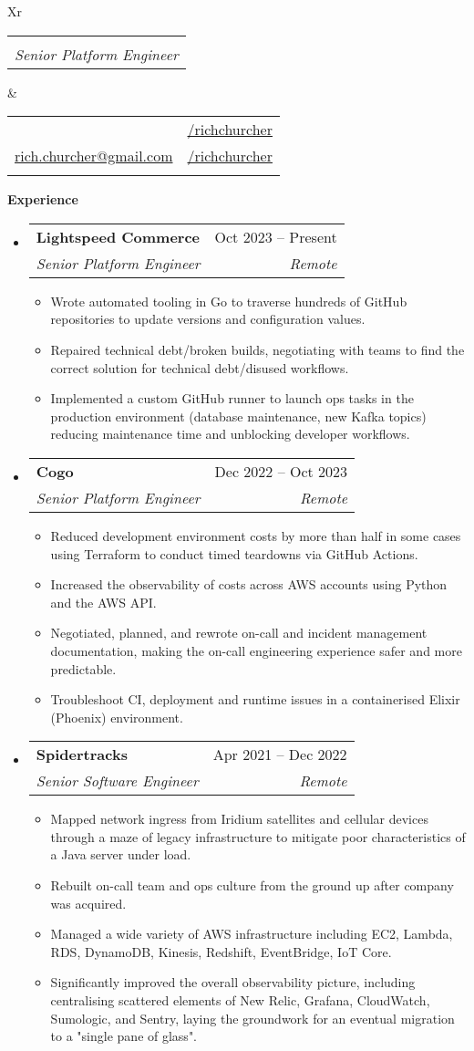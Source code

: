 \documentclass[12pt]{article}
\makeatletter
\def \fullname {Rich Churcher}
\def \subtitle {Senior Platform Engineer}
\def \linkedinicon {\faLinkedin}
\def \linkedinlink {https://linkedin.com/in/dwight-schrute/}
\def \linkedintext {/richchurcher}
\def \phoneicon {\faPhone}
\def \phonetext {+64-21-126-3919}
\def \emailicon {\faEnvelope}
\def \emaillink {mailto:rich.churcher@gmail.com}
\def \emailtext {rich.churcher@gmail.com}
\def \githubicon {\faGithub}
\def \githublink {https://github.com/richchurcher}
\def \githubtext {/richchurcher}
\def \headertype {\doublecol} %
\def \entryspacing {-0em}
\def \linkedin {\linkedinicon \hspace{1em}\href{\linkedinlink}{\linkedintext}}
\def \phone {\phoneicon \hspace{1em}{\phonetext}}
\def \email {\emailicon \hspace{1em}\href{\emaillink}{\emailtext}}
\def \github {\githubicon \hspace{1em}\href{\githublink}{\githubtext}}
\renewcommand{\section}[2]{\vspace{0.5ex}
  \colorbox{secondary}{\color{white}\raggedbottom\normalsize\textbf{{#1}{\hspace{0.5em}#2}}}
}
\newcommand{\resumeEntryStart}{\begin{itemize}[leftmargin=2.5mm]}
\newcommand{\resumeEntryEnd}{\end{itemize}\vspace{\entryspacing}}
\newcommand{\resumeItemListStart}{\begin{itemize}[leftmargin=4.5mm]}
\newcommand{\resumeItemListEnd}{\end{itemize}}
\newcommand{\resumeItem}[1]{
  \item\small{
    {#1 \vspace{-0.9ex}}
  }
}
\newcommand{\resumeEntryTSDL}[4]{
  \vspace{-0.5ex}\item[]
    \begin{tabularx}{0.97\textwidth}{X@{\hspace{5em}}r}
      \textbf{\color{primary}#1} & {\firabook\color{accent}\small#2} \\
      \textit{\color{accent}\small#3} & \textit{\color{accent}\small#4} \\
    \end{tabularx}\vspace{-0.9ex}
}
\newcommand{\doublecol}[6]{
  \begin{tabularx}{\textwidth}{Xr}
    {
      \begin{tabular}[c]{l}
        \fontsize{35}{45}\selectfont{\color{primary}{{\textbf{\fullname}}}} \\
          {\textit{\subtitle}}
      \end{tabular}\vspace{2ex}
    } & {
      \begin{tabular}[c]{l@{\hspace{1em}}l}
        {\small#4} & {\small#1} \\
        {\small#5} & {\small#2} \\
        {\small#6} & {\small#3}
      \end{tabular}
    }
  \end{tabularx}
}
\newcommand{\singlecol}[6]{
  \begin{tabularx}{\textwidth}{Xr}
    {
      \begin{tabular}[b]{l}
        \fontsize{35}{45}\selectfont{\color{primary}{{\textbf{\fullname}}}} \\
        {\textit{\subtitle}} %
      \end{tabular}
    } & {
      \begin{tabular}[c]{l}
        {\small#1} \\
        {\small#2} \\
        {\small#3} \\
        {\small#4} \\
        {\small#5} \\
        {\small#6}
      \end{tabular}
    }
  \end{tabularx}
}
\makeatother
\begin{document}
\headertype{\linkedin}{\github}{}{\phone}{\email}{}

\section{\faPieChart}{Experience}

  \resumeEntryStart
    \resumeEntryTSDL
      {Lightspeed Commerce}{Oct 2023 -- Present}
      {Senior Platform Engineer}{Remote}
    \resumeItemListStart
      \resumeItem {Wrote automated tooling in Go to traverse hundreds of GitHub repositories to update versions and configuration values.}
      \resumeItem {Repaired technical debt/broken builds, negotiating with teams to find the correct solution for technical debt/disused workflows.}
      \resumeItem {Implemented a custom GitHub runner to launch ops tasks in the production environment (database maintenance, new Kafka topics) reducing maintenance time and unblocking developer workflows.}
    \resumeItemListEnd
  \resumeEntryEnd
  
  \resumeEntryStart
    \resumeEntryTSDL
      {Cogo}{Dec 2022 -- Oct 2023}
      {Senior Platform Engineer}{Remote}
    \resumeItemListStart
      \resumeItem {Reduced development environment costs by more than half in some cases using Terraform to conduct timed teardowns via GitHub Actions.}
      \resumeItem {Increased the observability of costs across AWS accounts using Python and the AWS API.}
      \resumeItem {Negotiated, planned, and rewrote on-call and incident management documentation, making the on-call engineering experience safer and more predictable.}
      \resumeItem {Troubleshoot CI, deployment and runtime issues in a containerised Elixir (Phoenix) environment.}
    \resumeItemListEnd
  \resumeEntryEnd

  \resumeEntryStart
    \resumeEntryTSDL
      {Spidertracks}{Apr 2021 -- Dec 2022}
      {Senior Software Engineer}{Remote}
    \resumeItemListStart
      \resumeItem {Mapped network ingress from Iridium satellites and cellular devices through a maze of legacy infrastructure to mitigate poor characteristics of a Java server under load.}
      \resumeItem {Rebuilt on-call team and ops culture from the ground up after company was acquired.}
      \resumeItem {Managed a wide variety of AWS infrastructure including EC2, Lambda, RDS, DynamoDB, Kinesis, Redshift, EventBridge, IoT Core.}
      \resumeItem {Significantly improved the overall observability picture, including centralising scattered elements of New Relic, Grafana, CloudWatch, Sumologic, and Sentry, laying the groundwork for an eventual migration to a "single pane of glass".}
    \resumeItemListEnd
  \resumeEntryEnd
\end{document}
